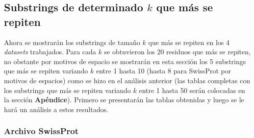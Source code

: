 \subsection{Substrings de determinado $k$ que más se repiten}

Ahora se mostrarán los substrings de tamaño $k$ que más se repiten en los 4 \textit{datasets} trabajados. Para cada $k$ se obtuvieron los 20 residuos que más se repiten, no obstante por motivos de espacio se mostrarán en esta sección los 5 substrings que más se repiten variando $k$ entre 1 hasta 10 (hasta 8 para SwissProt por motivos de espacios) como se hizo en el análisis anterior (las tablas completas con los substrings que más se repiten variando $k$ entre 1 hasta 50 serán colocadas en la sección \textbf{Apéndice}). Primero se presentarán las tablas obtenidas y luego se le hará un análisis a estos resultados.

\subsubsection{Archivo SwissProt}


